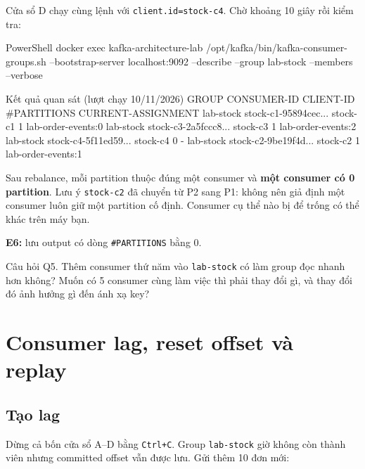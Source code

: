 Cửa sổ D chạy cùng lệnh với \texttt{client.\allowbreak{}id=\allowbreak{}stock-\allowbreak{}c4}. Chờ khoảng 10 giây rồi kiểm tra:


\begin{aivncodebox}[language={}]{PowerShell}
docker exec kafka-architecture-lab /opt/kafka/bin/kafka-consumer-groups.sh --bootstrap-server localhost:9092 --describe --group lab-stock --members --verbose
\end{aivncodebox}

\begin{aivnCodeOutput}{Kết quả quan sát (lượt chạy 10/11/2026)}
GROUP      CONSUMER-ID          CLIENT-ID  #PARTITIONS  CURRENT-ASSIGNMENT
lab-stock  stock-c1-95894cec... stock-c1   1            lab-order-events:0
lab-stock  stock-c3-2a5fccc8... stock-c3   1            lab-order-events:2
lab-stock  stock-c4-5f11ed59... stock-c4   0            -
lab-stock  stock-c2-9be19f4d... stock-c2   1            lab-order-events:1
\end{aivnCodeOutput}

Sau rebalance, mỗi partition thuộc đúng một consumer và \textbf{một consumer có 0 partition}. Lưu ý \texttt{stock-\allowbreak{}c2} đã chuyển từ P2 sang P1: không nên giả định một consumer luôn giữ một partition cố định. Consumer cụ thể nào bị để trống có thể khác trên máy bạn.


\begin{evidencebox}
\textbf{E6:} lưu output có dòng \texttt{\#PARTITIONS} bằng 0.
\end{evidencebox}

\begin{questionbox}{Câu hỏi Q5.}
Thêm consumer thứ năm vào \texttt{lab-\allowbreak{}stock} có làm group đọc nhanh hơn không? Muốn có 5 consumer cùng làm việc thì phải thay đổi gì, và thay đổi đó ảnh hưởng gì đến ánh xạ key?
\end{questionbox}

\section{Consumer lag, reset offset và replay}

\subsection{Tạo lag}

Dừng cả bốn cửa sổ A--D bằng \texttt{Ctrl+C}. Group \texttt{lab-\allowbreak{}stock} giờ không còn thành viên nhưng committed offset vẫn được lưu. Gửi thêm 10 đơn mới:


